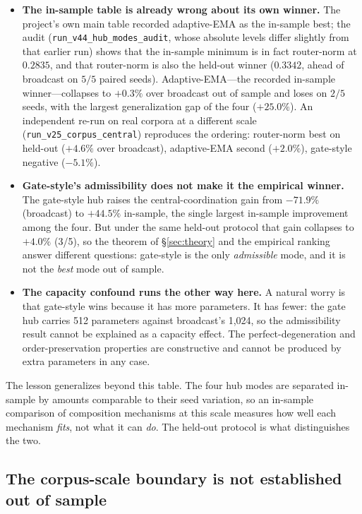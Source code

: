 \documentclass[10pt,twoside]{article}
\theoremstyle{definition}
\theoremstyle{plain}
\theoremstyle{remark}
\begin{document}
\begin{itemize}[leftmargin=1.4em, itemsep=2pt]
    \item \textbf{The in-sample table is already wrong about its own winner.} The project's own main table recorded adaptive-EMA as the in-sample best; the audit (\texttt{run\_v44\_hub\_modes\_audit}, whose absolute levels differ slightly from that earlier run) shows that the in-sample minimum is in fact router-norm at $0.2835$, and that router-norm is also the held-out winner ($0.3342$, ahead of broadcast on $5/5$ paired seeds). Adaptive-EMA---the recorded in-sample winner---collapses to $+0.3\%$ over broadcast out of sample and loses on $2/5$ seeds, with the largest generalization gap of the four ($+25.0\%$). An independent re-run on real corpora at a different scale (\texttt{run\_v25\_corpus\_central}) reproduces the ordering: router-norm best on held-out ($+4.6\%$ over broadcast), adaptive-EMA second ($+2.0\%$), gate-style negative ($-5.1\%$).
    \item \textbf{Gate-style's admissibility does not make it the empirical winner.} The gate-style hub raises the central-coordination gain from $-71.9\%$ (broadcast) to $+44.5\%$ in-sample, the single largest in-sample improvement among the four. But under the same held-out protocol that gain collapses to $+4.0\%$ (3/5), so the theorem of \S\ref{sec:theory} and the empirical ranking answer different questions: gate-style is the only \emph{admissible} mode, and it is not the \emph{best} mode out of sample.
    \item \textbf{The capacity confound runs the other way here.} A natural worry is that gate-style wins because it has more parameters. It has fewer: the gate hub carries 512 parameters against broadcast's 1{,}024, so the admissibility result cannot be explained as a capacity effect. The perfect-degeneration and order-preservation properties are constructive and cannot be produced by extra parameters in any case.
\end{itemize}

The lesson generalizes beyond this table. The four hub modes are separated in-sample by amounts comparable to their seed variation, so an in-sample comparison of composition mechanisms at this scale measures how well each mechanism \emph{fits}, not what it can \emph{do}. The held-out protocol is what distinguishes the two.

\subsection{The corpus-scale boundary is not established out of sample}
\label{sec:corpus}
\end{document}
